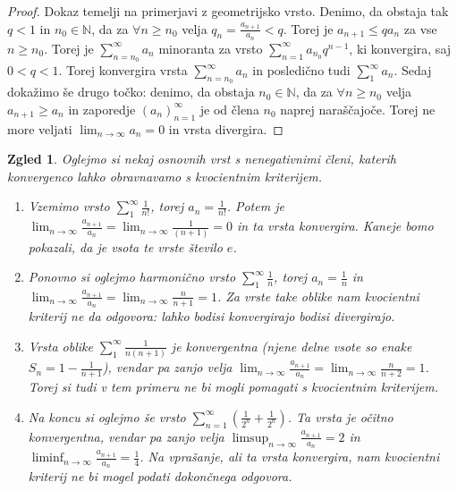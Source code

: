 \documentclass[10pt, a4paper]{article}
\newtheorem{zgled}{Zgled}[section]
\newenvironment{noticeC}{%
  \tcolorbox[%
  notitle,
  empty,
  enhanced,  %
  breakable,
  coltext=black, 
  fontupper=\rmfamily,
  parbox=false,
  noparskip,
  sharp corners,
  boxrule=-1pt,  %
  frame hidden,
  left=7pt,  %
  right=7pt,
  top=5pt,
  bottom=5pt,
  before skip=2.5ex plus 2pt,
  after skip=2.5ex plus 2pt,
  overlay unbroken and last={%
  },
  ]}
{\endtcolorbox}
\newenvironment{dokaz}%
  {\begin{noticeC}\begin{proof}}%
  {\end{proof}\end{noticeC}}
\newcommand{\N}{\mathbb {N}}
\newcommand{\zap}[1]{(#1_n)_{n=1} ^{\infty}}
\newcommand{\limzap}[1]{\lim_{n \to \infty} {#1}}
\begin{document}
\begin{dokaz}
    Dokaz temelji na primerjavi z geometrijsko vrsto.
    Denimo, da obstaja tak $q <1$ in $n_0 \in \N$, da za $\forall n \geq n_0$ velja
    $q_n = \frac{a_{n+1}}{a_n} < q$. Torej je $a_{n+1} \leq q a_n$ za vse $n \geq n_0$.
    Torej je $\sum_{n= n_0} ^\infty a_n$ minoranta za vrsto $\sum_{n=1} ^\infty a_{n_0} q^{n-1}$, ki konvergira, saj $0 < q < 1$.
    Torej konvergira vrsta $\sum_{n= n_0} ^\infty a_n$ in posledično tudi $\sum_{1} ^\infty a_n$.
    Sedaj dokažimo še drugo točko: denimo, da obstaja $n_0 \in \N$, da za $\forall n \geq n_0$ velja $a_{n+1} \geq a_n$ in zaporedje $\zap{a}$ je od člena $n_0$ naprej naraščajoče.
    Torej ne more veljati $\limzap{a_n} = 0$ in vrsta divergira. 
\end{dokaz}

\begin{zgled}
    Oglejmo si nekaj osnovnih vrst s nenegativnimi členi, katerih konvergenco lahko obravnavamo s kvocientnim kriterijem.
    \begin{enumerate}
        \item Vzemimo vrsto $\sum_1 ^\infty \frac{1}{n!}$, torej $a_n = \frac{1}{n!}$.
        Potem je $\limzap{\frac{a_{n+1}}{a_n}} = \limzap{\frac{1}{(n+1)}} = 0$ in ta vrsta konvergira.
        Kaneje bomo pokazali, da je vsota te vrste število $e$.
        \item Ponovno si oglejmo harmonično vrsto $\sum_1 ^\infty \frac{1}{n}$, torej $a_n = \frac{1}{n}$ in 
        $\limzap{\frac{a_{n+1}}{a_n}} = \limzap{\frac{n}{n+1}} = 1$.
        Za vrste take oblike nam kvocientni kriterij ne da odgovora: lahko bodisi konvergirajo bodisi divergirajo.
        \item Vrsta oblike $\sum_1 ^\infty \frac{1}{n(n+1)}$ je konvergentna (njene delne vsote so enake $S_n = 1 - \frac{1}{n+1}$), 
        vendar pa zanjo velja $\limzap{\frac{a_{n+1}}{a_n}} = \limzap{\frac{n}{n+2}} = 1$. Torej si tudi v tem primeru ne bi mogli pomagati s kvocientnim kriterijem. 
        \item Na koncu si oglejmo še vrsto $\sum_{n=1} ^\infty \left(\frac{1}{2^n} + \frac{1}{2^n}\right)$.
        Ta vrsta je očitno konvergentna, vendar pa zanjo velja $\limsup_{n \to \infty} \frac{a_{n+1}}{a_n} = 2$ in $\liminf_{n \to \infty} \frac{a_{n+1}}{a_n} = \frac{1}{4}$.
        Na vprašanje, ali ta vrsta konvergira, nam kvocientni kriterij ne bi mogel podati dokončnega odgovora.
    \end{enumerate}
\end{zgled}
\end{document}
